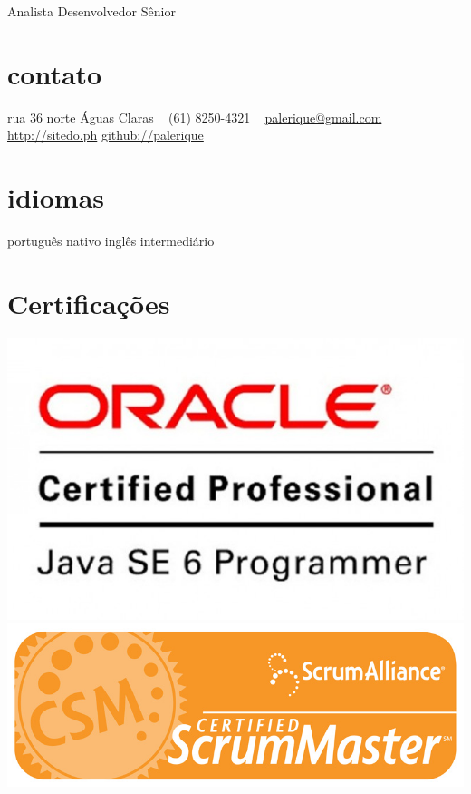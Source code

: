 
       {Analista Desenvolvedor Sênior}


\begin{aside}
  \section{contato}
    rua 36 norte
    Águas Claras
    ~
    (61) 8250-4321
    ~
    \href{mailto:palerique@gmail.com}{palerique@gmail.com}
    \href{http://sitedo.ph}{http://sitedo.ph}
    \href{http://github.com/palerique/}{github://palerique}
  \section{idiomas}
    português nativo
    inglês intermediário
  \section{Certificações}
    \includegraphics[scale=0.13]{ocpjp.jpg}
    \includegraphics[scale=0.13]{csm.png}
\end{aside}

